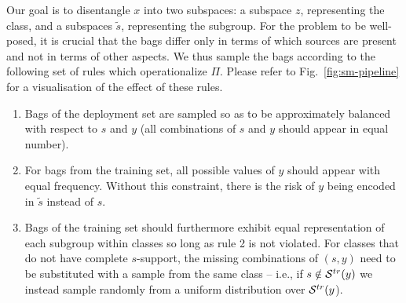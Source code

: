 Our goal is to disentangle $x$ into two subspaces: a subspace $z$, representing the class, and a
subspaces $\tilde{s}$,
representing the subgroup.
For the problem to be well-posed, it is crucial that the bags differ only
in terms of which sources are present and not in terms of other aspects.
We thus sample the bags according to the following set of rules which operationalize $\Pi$. Please
refer to Fig.~\ref{fig:sm-pipeline} for a visualisation of the effect of these rules. 
%
\begin{enumerate}\label{ls:rules}
  \item Bags of the deployment set are sampled so as to be approximately balanced with
    respect to $s$ and $y$ (all combinations of $s$ and $y$ should appear in equal number). 
  \item For bags from the training set, all possible values of $y$ should appear with equal
    frequency. Without this constraint, there is the risk of $y$ being encoded in $\tilde{s}$
    instead of $s$. 
  \item Bags of the training set should furthermore exhibit equal representation of each subgroup
    within classes so long as rule 2 is not violated.
    For classes that do not have complete $s$-support, the missing combinations of $(s, y)$ need to
    be substituted with a sample from the same class -- i.e., if $s \notin {\mathcal{S}}^{tr}(y)$ we instead
    sample randomly from a uniform distribution over ${\mathcal{S}}^{tr}(y$). 
\end{enumerate}





